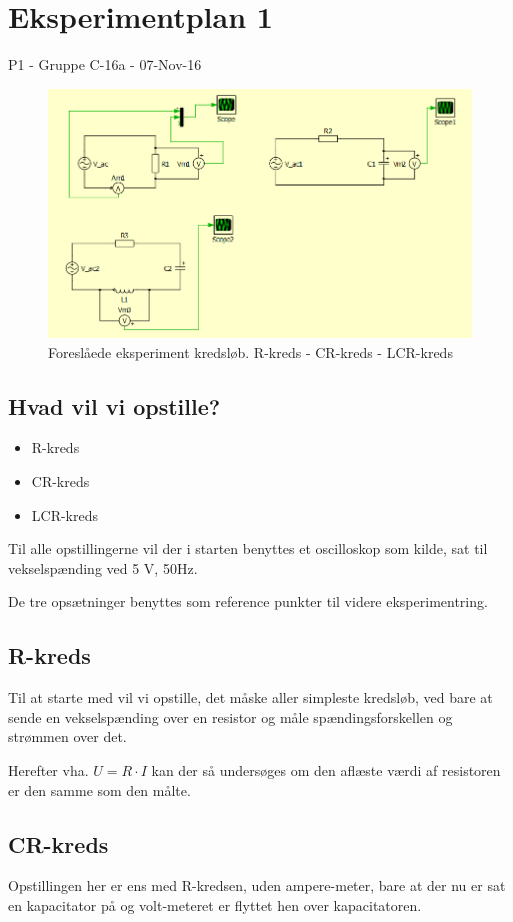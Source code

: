 \documentclass[a4paper,11pt]{memoir}
\begin{document}
\chapter{Eksperimentplan 1}
P1 - Gruppe C-16a - 07-Nov-16

\begin{figure}[htbp]
\centering
\includegraphics[width=1.2\textwidth]{schematics/Eks1_LCR.png}
\caption{Foreslåede eksperiment kredsløb. R-kreds - CR-kreds - LCR-kreds}
\label{fig:Eks1}
\end{figure}
\newpage

\section{Hvad vil vi opstille?}
\begin{itemize}
\item R-kreds
\item CR-kreds
\item LCR-kreds
\end{itemize}
Til alle opstillingerne vil der i starten benyttes et oscilloskop som kilde, sat til vekselspænding ved 5 V, 50Hz.

De tre opsætninger benyttes som reference punkter til videre eksperimentring.  
\section{R-kreds}
Til at starte med vil vi opstille, det måske aller simpleste kredsløb, ved bare at sende en vekselspænding over en resistor og måle spændingsforskellen og strømmen over det.

Herefter vha. $U=R\cdot I$ kan der så undersøges om den aflæste værdi af resistoren er den samme som den målte.
\section{CR-kreds}
Opstillingen her er ens med R-kredsen, uden ampere-meter, bare at der nu er sat en kapacitator på og volt-meteret er flyttet hen over kapacitatoren.
\end{document}
